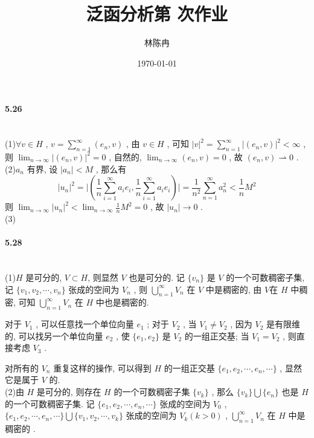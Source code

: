 \documentclass[UTF8]{ctexart}
\title{泛函分析第 次作业}
\author{林陈冉}
\date{\today}
\begin{document}
\maketitle
    \paragraph{5.26}\quad\\
        \noindent(1)\quad $\forall v \in H$ , 
        $v=\sum^{\infty}_{n=1}(e_n,v)$ , 
        由 $v \in H$ , 
        可知 $\vert v\vert^2=\sum^{\infty}_{n=1}\vert (e_n,v)\vert^2 < \infty$ , 
        则 $\lim_{n\rightarrow\infty}\vert (e_n,v)\vert^2 = 0$ , 
        自然的, $\lim_{n\rightarrow\infty}(e_n,v) = 0$ , 
        故 $(e_n,v)\rightharpoonup 0$ .\\

        \noindent(2)\quad ${a_n}$ 有界, 
        设 $\vert a_n\vert < M$ , 那么有
        \[\vert u_n\vert^2 = \vert (\frac{1}{n}\sum^{\infty}_{i=1}a_ie_i,\frac{1}{n}\sum^{\infty}_{i=1}a_ie_i)\vert = \frac{1}{n^2}\sum^{\infty}_{n=1}a_n^2 < \frac{1}{n}M^2\]
        则 $\lim_{n \rightarrow \infty}\vert u_n\vert^2 < \lim_{n \rightarrow \infty}\frac{1}{n}M^2 = 0$ ,
        故 $\vert u_n\vert \rightarrow 0$ .\\
        
        \noindent(3)\quad\\

    \paragraph{5.28}\quad\\
        \noindent(1)\quad$H$ 是可分的, $V \subset H$, 则显然 $V$ 也是可分的.
        记 $\{v_n\}$ 是 $V$ 的一个可数稠密子集, 
        记 $\{v_1, v_2, \cdots, v_n\}$ 张成的空间为 $V_n$ , 则 $\bigcup^\infty_{n=1}V_n$ 在 $V$ 中是稠密的, 由 $V$在 $H$ 中稠密, 可知 $\bigcup^\infty_{n=1}V_n$ 在 $H$ 中也是稠密的.

        对于 $V_1$ , 可以任意找一个单位向量 $e_1$ ; 
        对于 $V_2$ , 当 $V_1\neq V_2$ , 
        因为 $V_2$ 是有限维的, 可以找另一个单位向量 $e_2$ , 
        使 $\{e_1, e_2\}$ 是 $V_2$ 的一组正交基;
        当 $V_1= V_2$ , 则直接考虑 $V_3$ .

        对所有的 $V_n$ 重复这样的操作, 可以得到 $H$ 的一组正交基 $\{e_1, e_2, \cdots, e_n, \cdots \}$ , 显然它是属于 $V$ 的.\\

        \noindent(2)\quad 由 $H$ 是可分的, 则存在 $H$ 的一个可数稠密子集 $\{v_k\}$ ,
        那么  $\{v_k\}\bigcup\{e_n\}$ 也是 $H$ 的一个可数稠密子集.
        记 $\{e_1, e_2, \cdots, e_n, \cdots \}$ 张成的空间为 $V_0$ , 
        $\{e_1, e_2, \cdots, e_n, \cdots \}\bigcup\{v_1, v_2, \cdots, v_k\}$ 张成的空间为 $V_k(k>0)$ , $\bigcup^\infty_{n=1}V_n$ 在 $H$ 中是稠密的 .
\end{document}
